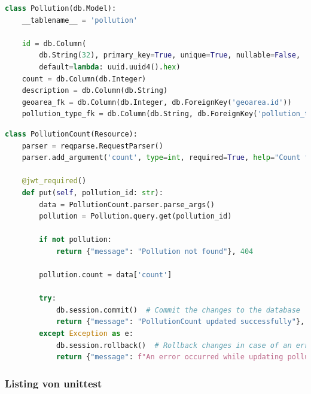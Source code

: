 \documentclass[a4paper,12pt]{article}
\begin{document}
\begin{lstlisting}[language=Python, caption=Implementation der Pollution-Klasse, label=lst:pollution]
class Pollution(db.Model):
    __tablename__ = 'pollution'

    id = db.Column(
        db.String(32), primary_key=True, unique=True, nullable=False,
        default=lambda: uuid.uuid4().hex)
    count = db.Column(db.Integer)
    description = db.Column(db.String)
    geoarea_fk = db.Column(db.Integer, db.ForeignKey('geoarea.id'))
    pollution_type_fk = db.Column(db.String, db.ForeignKey('pollution_type.id'))
\end{lstlisting}

\begin{lstlisting}[language=Python, caption=Implementation der PollutionCount-Klasse, label=lst:pollutionCount]
class PollutionCount(Resource):
    parser = reqparse.RequestParser()
    parser.add_argument('count', type=int, required=True, help="Count field is required")

    @jwt_required()
    def put(self, pollution_id: str):
        data = PollutionCount.parser.parse_args()
        pollution = Pollution.query.get(pollution_id)

        if not pollution:
            return {"message": "Pollution not found"}, 404

        pollution.count = data['count']

        try:
            db.session.commit()  # Commit the changes to the database
            return {"message": "PollutionCount updated successfully"}, 200
        except Exception as e:
            db.session.rollback()  # Rollback changes in case of an error
            return {"message": f"An error occurred while updating pollution: {str(e)}"}, 500
\end{lstlisting}

\clearpage
\subsubsection{Listing von unittest}
\label{sec:unittest}
\end{document}
